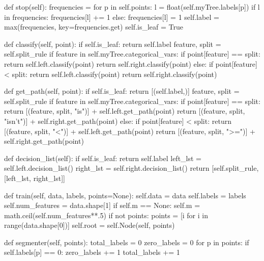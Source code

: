 \documentclass{article}
\begin{document}
\begin{python}
        def stop(self):
            frequencies = {}
            for p in self.points:
                l = float(self.myTree.labels[p])
                if l in frequencies:
                    frequencies[l] += 1
                else:
                    frequencies[l] = 1
            self.label = max(frequencies, key=frequencies.get)
            self.is_leaf = True

        def classify(self, point):
            if self.is_leaf:
                return self.label
            feature, split = self.split_rule
            if feature in self.myTree.categorical_vars:
                if point[feature] == split:
                    return self.left.classify(point)
                return self.right.classify(point)
            else:
                if point[feature] < split:
                    return self.left.classify(point)
                return self.right.classify(point)

        def get_path(self, point):
            if self.is_leaf:
                return [(self.label,)]
            feature, split = self.split_rule
            if feature in self.myTree.categorical_vars:
                if point[feature] == split:
                    return [(feature, split, "is")] + self.left.get_path(point)
                return [(feature, split, "isn't")] + self.right.get_path(point)
            else:
                if point[feature] < split:
                    return [(feature, split, "<")] + self.left.get_path(point)
                return [(feature, split, ">=")] + self.right.get_path(point)

        def decision_list(self):
            if self.is_leaf:
                return self.label
            left_lst = self.left.decision_list()
            right_lst = self.right.decision_list()
            return [self.split_rule, [left_lst, right_lst]]

    def train(self, data, labels, points=None):
        self.data = data
        self.labels = labels
        self.num_features = data.shape[1]
        if self.m == None:
            self.m = math.ceil(self.num_features**.5)
        if not points:
            points = [i for i in range(data.shape[0])]
        self.root = self.Node(self, points)

    def segmenter(self, points):
        total_labels = 0
        zero_labels = 0
        for p in points:
            if self.labels[p] == 0:
                zero_labels += 1
            total_labels += 1


\end{python}
\end{document}
